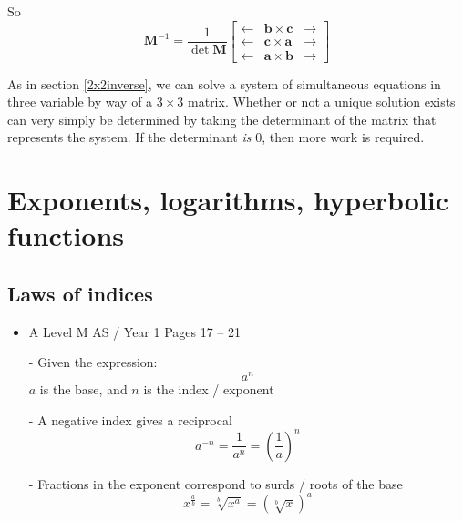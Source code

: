 \documentclass[11pt, a4paper]{article}
\begin{document}
So
\begin{equation*}
\boldsymbol{M}^{-1}=\frac{1}{\det\boldsymbol{M}}\begin{bmatrix} \leftarrow & \boldsymbol{b}\times\boldsymbol{c} & \rightarrow \\ \leftarrow & \boldsymbol{c}\times\boldsymbol{a} & \rightarrow \\ \leftarrow & \boldsymbol{a}\times\boldsymbol{b} & \rightarrow \end{bmatrix}
\end{equation*} \newline \par

As in section \ref{2x2inverse}, we can solve a system of simultaneous equations in three variable by way of a $3\times3$ matrix. Whether or not a unique solution exists can very simply be determined by taking the determinant of the matrix that represents the system. If the determinant \emph{is} 0, then more work is required.

\vspace{0.5cm}


\clearpage
\section{Exponents, logarithms, hyperbolic functions}
\vspace{0.5cm}

\subsection{Laws of indices}
\begin{itemize}
\item A Level M AS / Year 1 \hspace{1cm} \phantom{ } Pages 17 -- 21
\end{itemize} \par
\begin{itemize}
\item[-] Given the expression:
\begin{equation*}
a^{n}
\end{equation*}
$a$ is the base, and $n$ is the index / exponent
\item[-]A negative index gives a reciprocal
\begin{equation*}
a^{-n}=\frac{1}{a^{n}}=\left(\frac{1}{a}\right)^{n}
\end{equation*}
\item[-] Fractions in the exponent correspond to surds / roots of the base
\begin{equation*}
x^{\frac{a}{b}}=\sqrt[b]{x^{a}}=\left(\sqrt[b]{x}\right)^{a}
\end{equation*}
\end{itemize}
\vspace{0.5cm}
\end{document}
